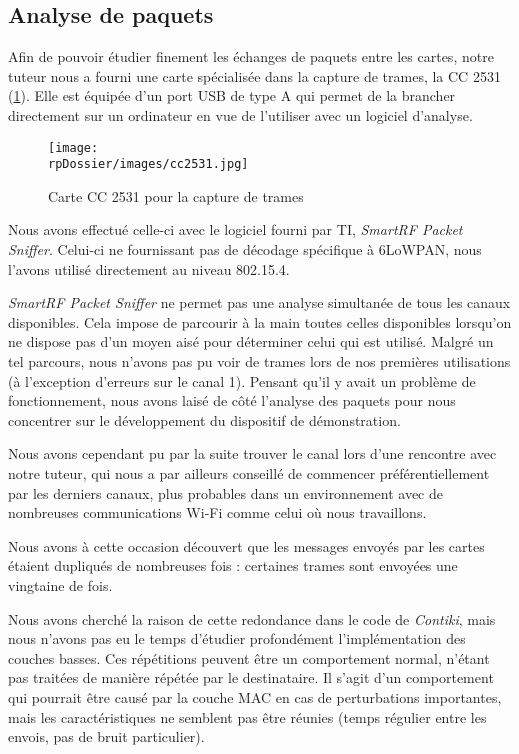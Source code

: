 \subsection{Analyse de paquets}

Afin de pouvoir étudier finement les échanges de paquets entre les cartes, notre tuteur nous a fourni une carte spécialisée dans la capture de trames, la CC 2531 (\cref{cc2531}).
Elle est équipée d’un port USB de type A qui permet de la brancher directement sur un ordinateur en vue de l’utiliser avec un logiciel d’analyse.

\begin{figure}[H]
\centering
\texttt{[image: \\rpDossier/images/cc2531.jpg]}
\caption{Carte CC 2531 pour la capture de trames}
\label{cc2531}
\end{figure}

Nous avons effectué celle-ci avec le logiciel fourni par TI, \emph{SmartRF Packet Sniffer}.
Celui-ci ne fournissant pas de décodage spécifique à 6LoWPAN, nous l’avons utilisé directement au niveau 802.15.4.

\emph{SmartRF Packet Sniffer} ne permet pas une analyse simultanée de tous les canaux disponibles.
Cela impose de parcourir à la main toutes celles disponibles lorsqu’on ne dispose pas d’un moyen aisé pour déterminer celui qui est utilisé.
Malgré un tel parcours, nous n’avons pas pu voir de trames lors de nos premières utilisations (à l’exception d’erreurs sur le canal 1).
Pensant qu’il y avait un problème de fonctionnement, nous avons laisé de côté l’analyse des paquets pour nous concentrer sur le développement du dispositif de démonstration.

Nous avons cependant pu par la suite trouver le canal lors d’une rencontre avec notre tuteur, qui nous a par ailleurs conseillé de commencer préférentiellement par les derniers canaux, plus probables dans un environnement avec de nombreuses communications Wi-Fi comme celui où nous travaillons.

Nous avons à cette occasion découvert que les messages envoyés par les cartes étaient dupliqués de nombreuses fois : certaines trames sont envoyées une vingtaine de fois.

Nous avons cherché la raison de cette redondance dans le code de \emph{Contiki}, mais nous n’avons pas eu le temps d’étudier profondément l’implémentation des couches basses.
Ces répétitions peuvent être un comportement normal, n’étant pas traitées de manière répétée par le destinataire.
Il s’agit d’un comportement qui pourrait être causé par la couche MAC en cas de perturbations importantes, mais les caractéristiques ne semblent pas être réunies (temps régulier entre les envois, pas de bruit particulier).

